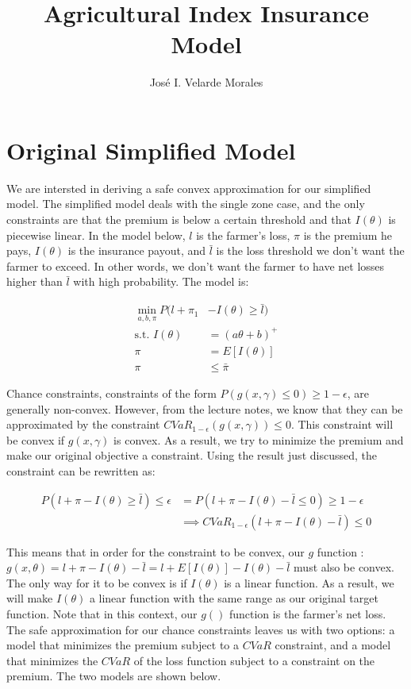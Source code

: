 \documentclass[11pt]{article}
\title{Agricultural Index Insurance Model}
\author{José I. Velarde Morales}
\begin{document}
\maketitle

\section{Original Simplified Model}
We are intersted in deriving a safe convex approximation for our simplified model. The simplified model deals with the single zone case, and the only constraints are that the premium is below a certain threshold and that $I(\theta)$ is piecewise linear. In the model below, $l$ is the farmer's loss, $\pi$ is the premium he pays, $I(\theta)$ is the insurance payout, and $\bar{l}$ is the loss threshold we don't want the farmer to exceed. In other words, we don't want the farmer to have net losses higher than $\bar{l}$ with high probability. The model is:

\begin{align}
    \min_{a,b,\pi} P(l + \pi_1 &-I(\theta) \geq \bar{l})\\
    \text{s.t.   } I(\theta) &= (a\theta + b)^+\\
    \pi &= E[I(\theta)]\\
    \pi &\leq \bar{\pi}
\end{align}

Chance constraints, constraints of the form $P(g(x,\gamma) \leq 0)\geq 1-\epsilon$, are generally non-convex. However, from the lecture notes, we know that they can be approximated by the constraint $CVaR_{1-\epsilon}(g(x,\gamma))\leq 0$. This constraint will be convex if $g(x,\gamma)$ is convex. As a result, we try to minimize the premium and make our original objective a constraint. Using the result just discussed, the constraint can be rewritten as:

\begin{align*}
    P(l+\pi-I(\theta) \geq \bar{l}) \leq \epsilon &= P(l+\pi-I(\theta) - \bar{l} \leq 0) \geq 1-\epsilon \\
    &\implies CVaR_{1-\epsilon}(l+\pi -I(\theta)-\bar{l}) \leq 0
\end{align*}

This means that in order for the constraint to be convex, our $g$ function : $g(x,\theta) = l+\pi -I(\theta) -\bar{l} = l+E[I(\theta)] -I(\theta) - \bar{l}$ must also be convex. The only way for it to be convex is if $I(\theta)$ is a linear function. As a result, we will make $I(\theta)$ a linear function with the same range as our original target function. Note that in this context, our $g()$ function is the farmer's net loss. The safe approximation for our chance constraints leaves us with two options: a model that minimizes the premium subject to a $CVaR$ constraint, and a model that minimizes the $CVaR$ of the loss function subject to a constraint on the premium. The two models are shown below. 
\end{document}
